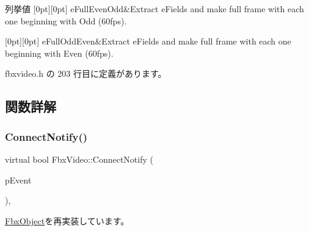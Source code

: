 \begin{DoxyEnumFields}{列挙値}
[0pt][0pt]{}\mbox{\label{class_fbx_video_a1e60229c28a15e29289f3f00b23aa215a5643f7d85ee0d023d43b0d0feb11ea73}} 
e\+Full\+Even\+Odd&Extract e\+Fields and make full frame with each one beginning with Odd (60fps). \\
\hline

[0pt][0pt]{}\mbox{\label{class_fbx_video_a1e60229c28a15e29289f3f00b23aa215aa342e3401c45173cdfd733920163340f}} 
e\+Full\+Odd\+Even&Extract e\+Fields and make full frame with each one beginning with Even (60fps). \\
\hline

\end{DoxyEnumFields}


 fbxvideo.\+h の 203 行目に定義があります。



\subsection{関数詳解}
\mbox{\label{class_fbx_video_afb1d8565917f33ab3777ac9e07b21cd0}} 
\subsubsection{\texorpdfstring{Connect\+Notify()}{ConnectNotify()}}
{\footnotesize\ttfamily virtual bool Fbx\+Video\+::\+Connect\+Notify (\begin{DoxyParamCaption}\item[{\hyperlink{class_fbx_connect_event}{Fbx\+Connect\+Event} const \&}]{p\+Event }\end{DoxyParamCaption})\hspace{0.3cm}{\ttfamily [protected]}, {\ttfamily [virtual]}}



\hyperlink{class_fbx_object_ab7a400f3829d1f0da57d3d78c8168dd0}{Fbx\+Object}を再実装しています。

